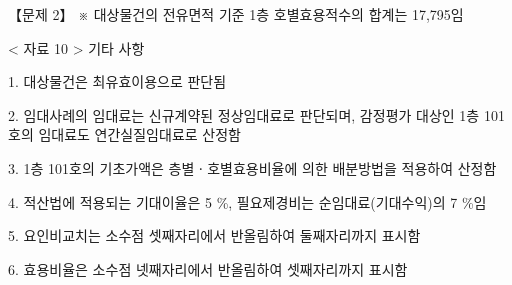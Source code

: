 \begin{longquestion}{【문제 2】}
※ 대상물건의 전유면적 기준 1층 호별효용적수의 합계는 17,795임 \par
< 자료 10 > 기타 사항 \par
1. 대상물건은 최유효이용으로 판단됨 \par
2. 임대사례의 임대료는 신규계약된 정상임대료로 판단되며, 감정평가 대상인 1층 101호의 임대료도 연간실질임대료로 산정함 \par
3. 1층 101호의 기초가액은 층별ㆍ호별효용비율에 의한 배분방법을 적용하여 산정함 \par
4. 적산법에 적용되는 기대이율은 5 \%, 필요제경비는 순임대료(기대수익)의 7 \%임 \par
5. 요인비교치는 소수점 셋째자리에서 반올림하여 둘째자리까지 표시함 \par
6. 효용비율은 소수점 넷째자리에서 반올림하여 셋째자리까지 표시함 \par
\end{longquestion}
